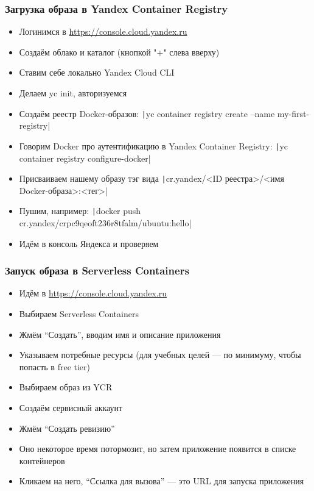 \documentclass{../../slides-style}
\begin{document}
    \begin{frame}
        \frametitle{Загрузка образа в Yandex Container Registry}
        \begin{itemize}
            \item Логинимся в \url{https://console.cloud.yandex.ru}
            \item Создаём облако и каталог (кнопкой "+" слева  вверху)
            \item Ставим себе локально Yandex Cloud CLI
            \item Делаем yc init, авторизуемся
            \item Создаём реестр Docker-образов: \texttt|yc container registry create --name my-first-registry|
            \item Говорим Docker про аутентификацию в Yandex Container Registry: \texttt|yc container registry configure-docker|
            \item Присваиваем нашему образу тэг вида \texttt|cr.yandex/<ID реестра>/<имя Docker-образа>:<тег>|
            \item Пушим, например: \texttt|docker push cr.yandex/crpc9qeoft236r8tfalm/ubuntu:hello|
            \item Идём в консоль Яндекса и проверяем
        \end{itemize}
    \end{frame}

    \begin{frame}
        \frametitle{Запуск образа в Serverless Containers}
        \begin{itemize}
            \item Идём в \url{https://console.cloud.yandex.ru}
            \item Выбираем Serverless Containers
            \item Жмём \enquote{Создать}, вводим имя и описание приложения
            \item Указываем потребные ресурсы (для учебных целей --- по минимуму, чтобы попасть в free tier)
            \item Выбираем образ из YCR
            \item Создаём сервисный аккаунт
            \item Жмём \enquote{Создать ревизию}
            \item Оно некоторое время потормозит, но затем приложение появится в списке контейнеров
            \item Кликаем на него, \enquote{Ссылка для вызова} --- это URL для запуска приложения
        \end{itemize}
    \end{frame}
\end{document}
